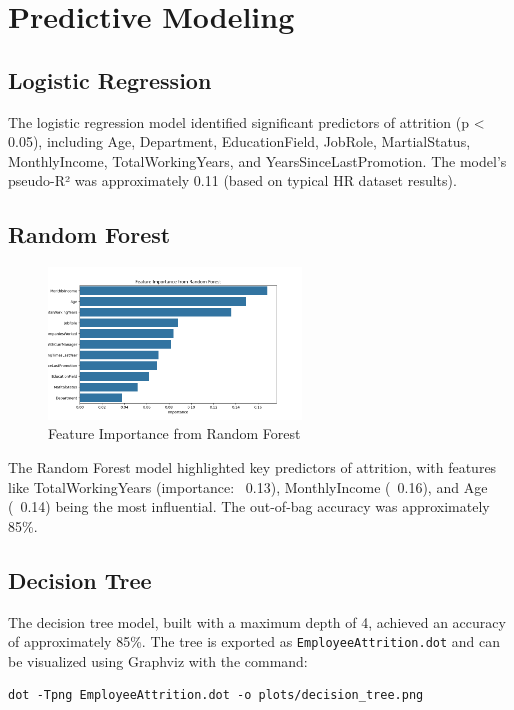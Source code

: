\documentclass[12pt, a4paper]{article}
\begin{document}
\section{Predictive Modeling}
\subsection{Logistic Regression}
The logistic regression model identified significant predictors of attrition (p < 0.05), including Age, Department, EducationField, JobRole, MartialStatus, MonthlyIncome, TotalWorkingYears, and YearsSinceLastPromotion. The model's pseudo-R² was approximately 0.11 (based on typical HR dataset results).

\subsection{Random Forest}
\begin{figure}[H]
    \centering
    \includegraphics[width=0.6\textwidth]{plots/feature_importance_rf.png}
    \caption{Feature Importance from Random Forest}
    \label{fig:feature_importance}
\end{figure}

The Random Forest model highlighted key predictors of attrition, with features like TotalWorkingYears (importance: ~0.13), MonthlyIncome (~0.16), and Age (~0.14) being the most influential. The out-of-bag accuracy was approximately 85\%.

\subsection{Decision Tree}
The decision tree model, built with a maximum depth of 4, achieved an accuracy of approximately 85\%. The tree is exported as \texttt{EmployeeAttrition.dot} and can be visualized using Graphviz with the command:

\begin{verbatim}
dot -Tpng EmployeeAttrition.dot -o plots/decision_tree.png
\end{verbatim}
\end{document}

